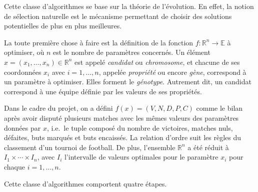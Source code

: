 \documentclass[12pt,a4paper]{article}
\begin{document}
Cette classe d'algorithmes se base sur la th\'eorie de l'\'evolution. En effet, 
la notion de s\'election naturelle est le m\'ecanisme permettant de choisir des 
solutions potentielles de plus en plus meilleures.

La toute premi\`ere chose \`a faire est la d\'efinition de la fonction 
$f: \mathbb{R}^n \to \mathbb{E}$ \`a optimiser, o\`u $n$ est le nombre de 
param\`etres concern\'es. Un \'el\'ement $x=(x_1,\dotsc,x_n) \in \mathbb{R}^n$ 
est appel\'e {\itshape candidat} ou {\itshape chromosome}, et chacune de ses 
coordonn\'ees $x_i$ avec $i=1,\dotsc,n$, appel\'ee {\itshape propri\'et\'e} 
ou encore {\itshape g\`ene}, correspond \`a un param\`etre \`a optimiser. Elles 
forment le {\itshape g\'enotype}.
Autrement dit, un candidat correspond \`a une \'equipe d\'efinie par les valeurs
de ses propri\'et\'es.

Dans le cadre du projet, on a d\'efini $f(x)=(V,N,D,P,C)$ comme le 
bilan apr\`es avoir disput\'e plusieurs matches avec les m\^emes valeurs des 
param\`etres donn\'ees par $x$, i.e.\ le tuple compos\'e du nombre de 
victoires, matches nuls, d\'efaites, buts marqu\'es et buts encaiss\'es. La 
relation d'ordre suit les r\`egles du classement d'un tournoi de football.
De plus, l'ensemble $\mathbb{R}^n$ a \'et\'e r\'eduit \`a $I_1 \times 
\dotsm \times I_n$, avec $I_i$ l'intervalle de valeurs optimales pour le 
param\`etre $x_i$ pour chaque $i = 1,\dotsc, n$.

Cette classe d'algorithmes comportent quatre \'etapes.
\end{document}
